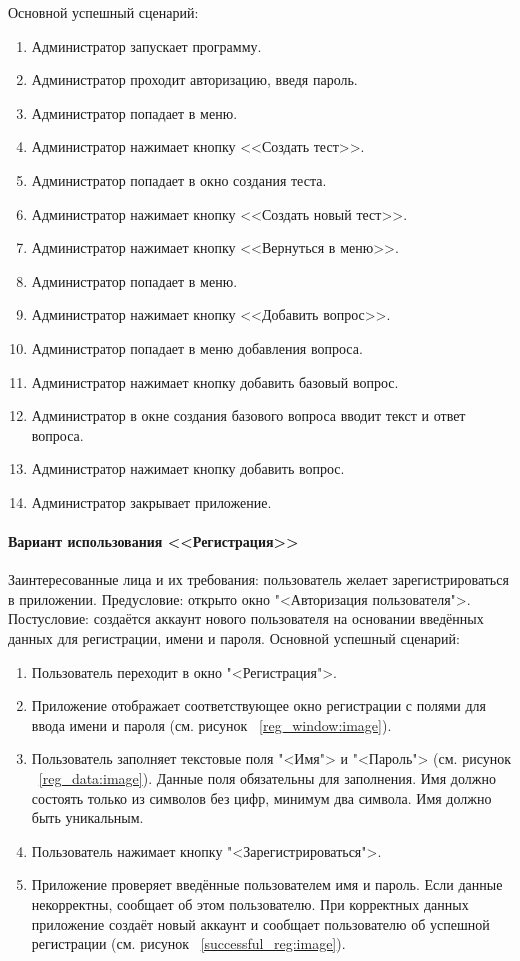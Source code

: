 Основной успешный сценарий:
\begin{enumerate}
	\item Администратор запускает программу.
	\item Администратор проходит авторизацию, введя пароль.
	\item Администратор попадает в меню.
	\item Администратор нажимает кнопку <<Создать тест>>.
	\item Администратор попадает в окно создания теста.
	\item Администратор нажимает кнопку <<Создать новый тест>>.
	\item Администратор нажимает кнопку <<Вернуться в меню>>.
	\item Администратор попадает в меню.
	\item Администратор нажимает кнопку <<Добавить вопрос>>.
	\item Администратор попадает в меню добавления вопроса.
	\item Администратор нажимает кнопку добавить базовый вопрос.
	\item Администратор в окне создания базового вопроса вводит текст и ответ вопроса.
	\item Администратор нажимает кнопку добавить вопрос.
	\item Администратор закрывает приложение.
\end{enumerate}

\paragraph{Вариант использования <<Регистрация>>}

Заинтересованные лица и их требования: пользователь желает зарегистрироваться в приложении.
\newline Предусловие: открыто окно "<Авторизация пользователя">.
\newline Постусловие: создаётся аккаунт нового пользователя на основании введённых данных для регистрации, имени и пароля.
\newline Основной успешный сценарий:
\begin{enumerate}
	\item Пользователь переходит в окно "<Регистрация">.
	\item Приложение отображает соответствующее окно регистрации с полями для ввода имени и пароля (см. рисунок ~\ref{reg_window:image}).
	\item Пользователь заполняет текстовые поля "<Имя"> и "<Пароль"> (см. рисунок ~\ref{reg_data:image}). Данные поля обязательны для заполнения. Имя должно состоять только из символов без цифр, минимум два символа. Имя должно быть уникальным.
	\item Пользователь нажимает кнопку "<Зарегистрироваться">.
	\item Приложение проверяет введённые пользователем имя и пароль. Если данные некорректны, сообщает об этом пользователю. При корректных данных приложение создаёт новый аккаунт и сообщает пользователю об успешной регистрации (см. рисунок ~\ref{successful_reg:image}).
\end{enumerate}

